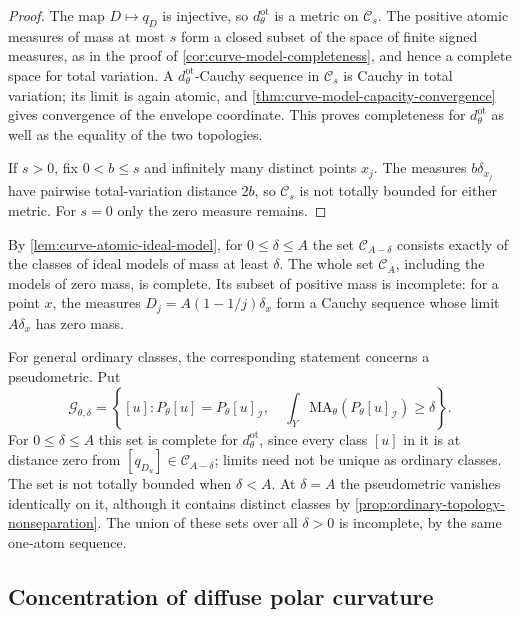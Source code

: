 \begin{proof}
The map $D\mapsto q_D$ is injective, so $d^{\mathrm{ot}}_\theta$ is a metric on $\mathcal C_s$. The positive atomic measures of mass at most $s$ form a closed subset of the space of finite signed measures, as in the proof of \cref{cor:curve-model-completeness}, and hence a complete space for total variation. A $d^{\mathrm{ot}}_\theta$-Cauchy sequence in $\mathcal C_s$ is Cauchy in total variation; its limit is again atomic, and \cref{thm:curve-model-capacity-convergence} gives convergence of the envelope coordinate. This proves completeness for $d^{\mathrm{ot}}_\theta$ as well as the equality of the two topologies.

If $s>0$, fix $0<b\leq s$ and infinitely many distinct points $x_j$. The measures $b\delta_{x_j}$ have pairwise total-variation distance $2b$, so $\mathcal C_s$ is not totally bounded for either metric. For $s=0$ only the zero measure remains.
\end{proof}

By \cref{lem:curve-atomic-ideal-model}, for $0\leq\delta\leq A$ the set $\mathcal C_{A-\delta}$ consists exactly of the classes of ideal models of mass at least $\delta$. The whole set $\mathcal C_A$, including the models of zero mass, is complete. Its subset of positive mass is incomplete: for a point $x$, the measures $D_j=A(1-1/j)\delta_x$ form a Cauchy sequence whose limit $A\delta_x$ has zero mass.

For general ordinary classes, the corresponding statement concerns a pseudometric. Put
\[
 \mathcal G_{\theta,\delta}
 =\left\{[u]:P_\theta[u]=P_\theta[u]_{\mathcal I},\quad
       \int_Y\mathrm{MA}_\theta(P_\theta[u]_{\mathcal I})\geq\delta\right\}.
\]
For $0\leq\delta\leq A$ this set is complete for $d^{\mathrm{ot}}_\theta$, since every class $[u]$ in it is at distance zero from $[q_{D_u}]\in\mathcal C_{A-\delta}$; limits need not be unique as ordinary classes. The set is not totally bounded when $\delta<A$. At $\delta=A$ the pseudometric vanishes identically on it, although it contains distinct classes by \cref{prop:ordinary-topology-nonseparation}. The union of these sets over all $\delta>0$ is incomplete, by the same one-atom sequence.

\subsection{Concentration of diffuse polar curvature}

